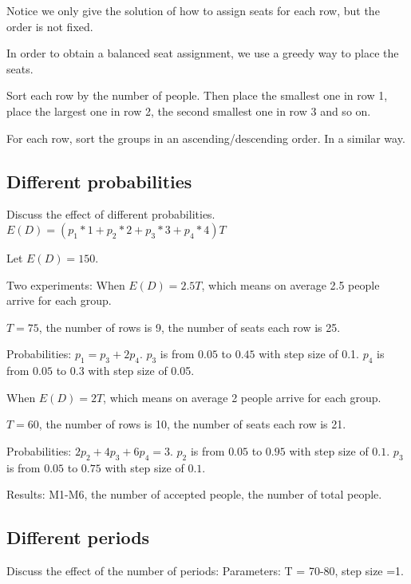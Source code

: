 Notice we only give the solution of how to assign seats for each row, but the order is not fixed.

In order to obtain a balanced seat assignment, we use a greedy way to place the seats.

Sort each row by the number of people. Then place the smallest one in row 1, place the largest one in row 2, the second smallest one in row 3 and so on. 

For each row, sort the groups in an ascending/descending order. In a similar way.

\subsection{Different probabilities}
Discuss the effect of different probabilities.
$E(D) = (p_1 * 1 + p_2 * 2 + p_3 * 3 + p_4 * 4) T$





Let $E(D) = 150$.

Two experiments:
When $E(D) = 2.5T$, which means on average 2.5 people arrive for each group.

$T =75$, the number of rows is 9, the number of seats each row is 25.

Probabilities: 
$p_1 = p_3 + 2p_4$. $p_3$ is from $0.05$ to $0.45$ with step size of 0.1. $p_4$ is from $0.05$ to $0.3$ with step size of 0.05.

When $E(D) = 2T$, which means on average 2 people arrive for each group.

$T = 60$, the number of rows is 10, the number of seats each row is 21.

Probabilities: 
$2p_2 + 4p_3 + 6p_4 =3$. $p_2$ is from $0.05$ to $0.95$ with step size of $0.1$. $p_3$ is from $0.05$ to $0.75$ with step size of $0.1$.

Results: M1-M6, the number of accepted people, the number of total people.

\subsection{Different periods}
Discuss the effect of the number of periods: 
Parameters: T = 70-80, step size =1.

